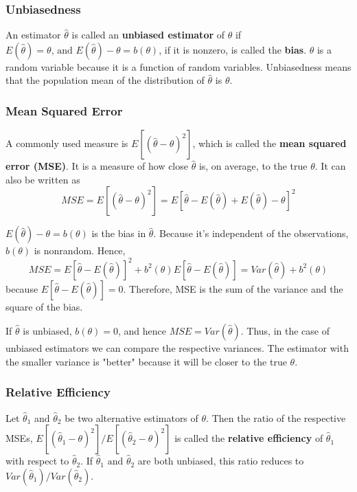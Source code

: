 \documentclass{article}
\begin{document}
\subsubsection{Unbiasedness}

An estimator \(\hat{\theta}\) is called an \textbf{unbiased estimator} of \(\theta\) if \(E(\hat{\theta})=\theta \text{, and } E(\hat{\theta})-\theta=b(\theta)\), if it is nonzero, is called the \textbf{bias}. \(\hat{\theta}\) is a random variable because it is a function of random variables. Unbiasedness means that the population mean of the distribution of \(\hat{\theta}\) is \(\theta\).

\subsubsection{Mean Squared Error}

A commonly used measure is \(E[(\hat{\theta}-\theta)^2]\), which is called the \textbf{mean squared error (MSE)}. It is a measure of how close \(\hat{\theta}\) is, on average, to the true \(\theta\). It can also be written as
\begin{equation*}
    MSE=E[(\hat{\theta}-\theta)^2]=E[\hat{\theta}-E(\hat{\theta})+E(\hat{\theta})-\theta]^2
\end{equation*}

\(E(\hat{\theta})-\theta=b(\theta)\) is the bias in \(\hat{\theta}\). Because it's independent of the observations, \(b(\theta)\) is nonrandom. Hence,
\begin{equation*}
    MSE=E[\hat{\theta}-E(\hat{\theta})]^2+b^2(\theta)E[\hat{\theta}-E(\hat{\theta})]=Var(\hat{\theta})+b^2(\theta)
\end{equation*}
because \(E[\hat{\theta}-E(\hat{\theta})]=0\). Therefore, MSE is the sum of the variance and the square of the bias.

If \(\hat{\theta}\) is unbiased, \(b(\theta)=0\), and hence \(MSE=Var(\hat{\theta})\). Thus, in the case of unbiased estimators we can compare the respective variances. The estimator with the smaller variance is "better" because it will be closer to the true $\theta$.

\subsubsection{Relative Efficiency}

Let \(\hat{\theta}_1\) and \(\hat{\theta}_2\) be two alternative estimators of $\theta$. Then the ratio of the respective MSEs, \(E[(\hat{\theta}_1-\theta)^2]/E[(\hat{\theta}_2-\theta)^2]\) is called the \textbf{relative efficiency} of \(\hat{\theta}_1\) with respect to \(\hat{\theta}_2\). If \(\hat{\theta}_1 \text{ and } \hat{\theta}_2\) are both unbiased, this ratio reduces to \(Var(\hat{\theta}_1)/Var(\hat{\theta}_2)\). 
\end{document}
